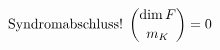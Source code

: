 \documentclass[preview]{standalone}
\begin{document}
\begin{align*}
\special{dvisvgm:raw <g id='unique000'>}\text{Syndromabschluss! }\binom{\dim F}{m_K}=0\special{dvisvgm:raw </g>}
\end{align*}
\end{document}
